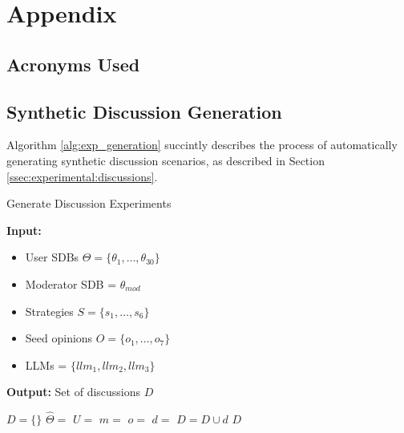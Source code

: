 \section{Appendix}
\label{sec:appendix}

\subsection{Acronyms Used}

\begin{acronym}[WWW] %
\end{acronym}


\subsection{Synthetic Discussion Generation}

Algorithm \ref{alg:exp_generation} succintly describes the process of automatically generating synthetic discussion scenarios, as described in Section \ref{ssec:experimental:discussions}.

\begin{algorithm}
\caption{Generate Discussion Experiments}
\label{alg:exp_generation}
\hspace*{\algorithmicindent} \textbf{Input:} 
         \begin{itemize}[noitemsep, nosep]
             \item User \acp{SDB} $\Theta = \{\theta_1, \dots, \theta_{30}\}$
             \item Moderator SDB = $\theta_{mod}$
             \item Strategies $S = \{s_1, \ldots, s_6\}$
             \item Seed opinions $O = \{o_1, \ldots, o_7\}$
             \item LLMs = $\{llm_1, llm_2, llm_3\}$
         \end{itemize}
         \hspace*{\algorithmicindent} \textbf{Output:} Set of discussions $D$
\begin{algorithmic}[1]
    \State $D = \{\}$
                \State $\hat{\Theta} = $ 
                \State $U =$  
                \State $m = $ 
                \State $o = $ 
                \State $d =$ 
                \State $D = D \cup d$
            \EndFor
        \EndFor
    \EndFor
    \State \Return $D$
\end{algorithmic}
\end{algorithm}

